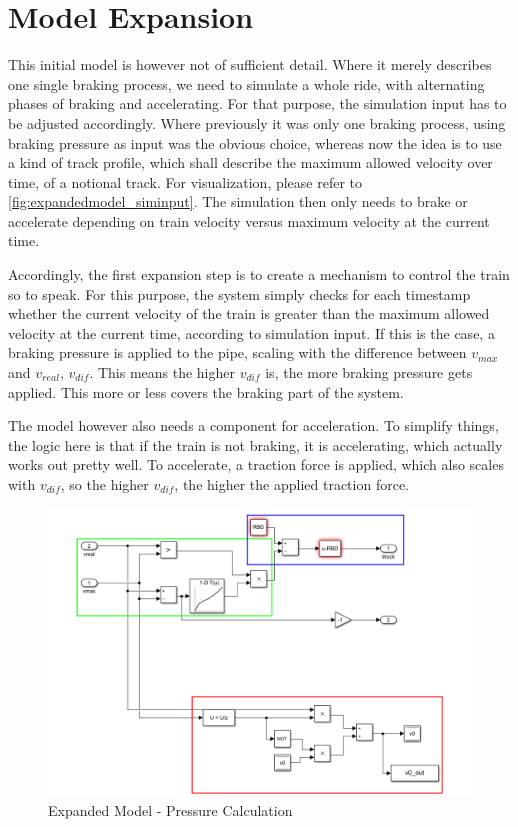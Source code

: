 \section{Model Expansion}
\label{sec:ModelExpansion}

\par\noindent
This initial model is however not of sufficient detail. Where it merely describes one single braking process, we need to simulate a whole ride, with alternating phases of braking and accelerating. For that purpose, the simulation input has to be adjusted accordingly. Where previously it was only one braking process, using braking pressure as input was the obvious choice, whereas now the idea is to use a kind of track profile, which shall describe the maximum allowed velocity over time, of a notional track. For visualization, please refer to \ref{fig:expandedmodel_siminput}. The simulation then only needs to brake or accelerate depending on train velocity versus maximum velocity at the current time.

\par
Accordingly, the first expansion step is to create a mechanism to control the train so to speak. For this purpose, the system simply checks for each timestamp whether the current velocity of the train is greater than the maximum allowed velocity at the current time, according to simulation input. If this is the case, a braking pressure is applied to the pipe, scaling with the difference between $v_{max}$ and $v_{real}$, $v_{dif}$. This means the higher $v_{dif}$ is, the more braking pressure gets applied. This more or less covers the braking part of the system.

\par
The model however also needs a component for acceleration. To simplify things, the logic here is that if the train is not braking, it is accelerating, which actually works out pretty well. To accelerate, a traction force is applied, which also scales with $v_{dif}$, so the higher $v_{dif}$, the higher the applied traction force.

\begin{figure}[H]
	\centering
	\includegraphics[width=\linewidth]{./pic/expandedmodel_pressure}
	\caption{Expanded Model - Pressure Calculation}
	\label{fig:expandedmodel_pressure}
\end{figure}

